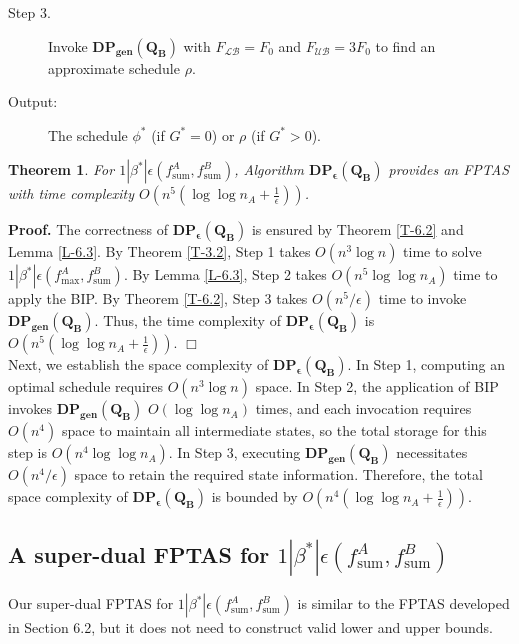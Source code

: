 \documentclass[12pt]{article}
\newtheorem{theorem}{Theorem}[section]
\begin{document}
\begin{sloppypar}
\begin{description}
\item [Step 3.] Invoke $\mathbf{DP_{gen}(Q_B)}$ with $F_{\mathcal{LB}}=F_0$ and $F_{\mathcal{UB}}=3F_0$ to
find an approximate schedule $\rho$.

\item [Output:] The schedule $\phi^{*}$ (if $G^{*}=0$) or $\rho$ (if $G^{*}>0$).
\end{description}

\begin{theorem} \label{T-6.3}
For $1 | \beta^{*}|\epsilon(f_{\mathrm{sum}}^A, f_{\mathrm{sum}}^B)$, Algorithm $\mathbf{DP_{\epsilon}(Q_B)}$ provides an FPTAS with time complexity $O(n^5(\log \log n_A +\frac{1}{\epsilon}))$.
\end{theorem}

\noindent\textbf{Proof.} The correctness of $\mathbf{DP_{\epsilon}(Q_B)}$ is ensured by Theorem \ref{T-6.2} and Lemma \ref{L-6.3}. By Theorem \ref{T-3.2}, Step 1 takes $O(n^3 \log n)$ time to solve 
$1 | \beta^{*}|\epsilon(f_{\mathrm{max}}^A, f_{\mathrm{sum}}^B)$. By Lemma \ref{L-6.3}, Step 2 takes $O(n^5 \log \log n_A)$ time to apply the BIP. By Theorem \ref{T-6.2}, Step 3 takes $O(n^5 /\epsilon)$ time to invoke $\mathbf{DP_{gen}(Q_B)}$. Thus, the time complexity of $\mathbf{DP_{\epsilon}(Q_B)}$ is $O(n^5(\log \log n_A +\frac{1}{\epsilon}))$. \hfill$\Box$\\

Next, we establish the space complexity of $\mathbf{DP_{\epsilon}(Q_B)}$. In Step 1, computing an optimal schedule requires $O(n^3 \log n)$ space. In Step 2, the application of BIP invokes $\mathbf{DP_{gen}(Q_B)}$ $O(\log \log n_A)$ times, and each invocation requires $O(n^4)$ space to maintain all intermediate states, so the total storage for this step is $O(n^4 \log \log n_A)$. In Step 3, executing $\mathbf{DP_{gen}(Q_B)}$ necessitates $O(n^4/\epsilon)$ space to retain the required state information. Therefore, the total space complexity of $\mathbf{DP_{\epsilon}(Q_B)}$ is bounded by $O(n^4(\log \log n_A +\frac{1}{\epsilon}))$.

\subsection{A super-dual FPTAS for $1 | \beta^{*}|\epsilon(f_{\mathrm{sum}}^A, f_{\mathrm{sum}}^B)$}

Our super-dual FPTAS for $1 | \beta^{*}|\epsilon(f_{\mathrm{sum}}^A, f_{\mathrm{sum}}^B)$ is similar to the FPTAS developed in Section 6.2, but it does not need to construct valid lower and upper bounds.


\end{sloppypar}
\end{document}
